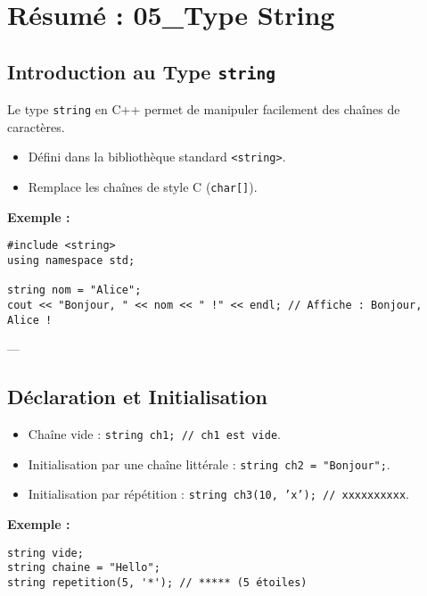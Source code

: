 \section{ Résumé : 05\_Type String}

\subsection{ Introduction au Type \texttt{string}}
Le type \texttt{string} en C++ permet de manipuler facilement des chaînes de caractères.
\begin{itemize}
    \item Défini dans la bibliothèque standard \texttt{<string>}.
    \item Remplace les chaînes de style C (\texttt{char[]}).
\end{itemize}

\textbf{Exemple :}
\begin{tcolorbox}[colframe=blue!50!black, colback=blue!5!white, title=Exemple de Type string]
\begin{verbatim}
#include <string>
using namespace std;

string nom = "Alice";
cout << "Bonjour, " << nom << " !" << endl; // Affiche : Bonjour, Alice !
\end{verbatim}
\end{tcolorbox}

---

\subsection{ Déclaration et Initialisation}
\begin{itemize}
    \item Chaîne vide : \texttt{string ch1; // ch1 est vide}.
    \item Initialisation par une chaîne littérale : \texttt{string ch2 = "Bonjour";}.
    \item Initialisation par répétition : \texttt{string ch3(10, 'x'); // xxxxxxxxxx}.
\end{itemize}

\textbf{Exemple :}
\begin{tcolorbox}[colframe=blue!50!black, colback=blue!5!white, title=Exemple de Déclaration et Initialisation]
\begin{verbatim}
string vide;
string chaine = "Hello";
string repetition(5, '*'); // ***** (5 étoiles)
\end{verbatim}
\end{tcolorbox}

